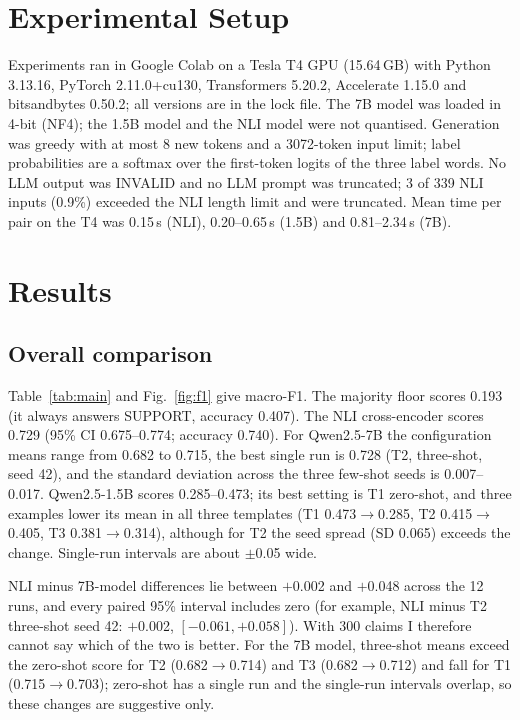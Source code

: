 \documentclass[conference]{IEEEtran}
\begin{document}
\section{Experimental Setup}
Experiments ran in Google Colab on a Tesla T4 GPU (15.64\,GB) with Python 3.13.16, PyTorch 2.11.0+cu130, Transformers 5.20.2, Accelerate 1.15.0 and bitsandbytes 0.50.2; all versions are in the lock file. The 7B model was loaded in 4-bit (NF4); the 1.5B model and the NLI model were not quantised. Generation was greedy with at most 8 new tokens and a 3072-token input limit; label probabilities are a softmax over the first-token logits of the three label words. No LLM output was INVALID and no LLM prompt was truncated; 3 of 339 NLI inputs (0.9\%) exceeded the NLI length limit and were truncated. Mean time per pair on the T4 was 0.15\,s (NLI), 0.20--0.65\,s (1.5B) and 0.81--2.34\,s (7B).

\section{Results}
\subsection{Overall comparison}
Table~\ref{tab:main} and Fig.~\ref{fig:f1} give macro-F1. The majority floor scores 0.193 (it always answers SUPPORT, accuracy 0.407). The NLI cross-encoder scores 0.729 (95\% CI 0.675--0.774; accuracy 0.740). For Qwen2.5-7B the configuration means range from 0.682 to 0.715, the best single run is 0.728 (T2, three-shot, seed 42), and the standard deviation across the three few-shot seeds is 0.007--0.017. Qwen2.5-1.5B scores 0.285--0.473; its best setting is T1 zero-shot, and three examples lower its mean in all three templates (T1 0.473$\to$0.285, T2 0.415$\to$0.405, T3 0.381$\to$0.314), although for T2 the seed spread (SD 0.065) exceeds the change. Single-run intervals are about $\pm$0.05 wide.

NLI minus 7B-model differences lie between $+$0.002 and $+$0.048 across the 12 runs, and every paired 95\% interval includes zero (for example, NLI minus T2 three-shot seed 42: $+$0.002, $[-0.061, +0.058]$). With 300 claims I therefore cannot say which of the two is better. For the 7B model, three-shot means exceed the zero-shot score for T2 (0.682$\to$0.714) and T3 (0.682$\to$0.712) and fall for T1 (0.715$\to$0.703); zero-shot has a single run and the single-run intervals overlap, so these changes are suggestive only.
\end{document}
